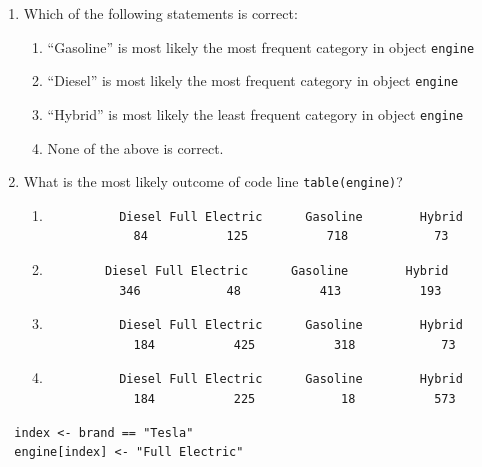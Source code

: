 \documentclass{article}
\begin{document}
\begin{enumerate}[resume]
  \item Which of the following statements is correct:
  \begin{enumerate}[label=\Alph*)]
    \item ``Gasoline'' is most likely the most frequent category in object \texttt{engine}
    \item ``Diesel'' is most likely the most frequent category in object \texttt{engine}
    \item ``Hybrid'' is most likely the least frequent category in object \texttt{engine}
    \item None of the above is correct.
  \end{enumerate}
  \item What is the most likely outcome of code line \texttt{table(engine)}?
    \begin{enumerate}[label=\Alph*)]
      \item 
      \begin{verbatim}
          Diesel Full Electric      Gasoline        Hybrid 
            84           125           718            73 
      \end{verbatim}

      \item 
      \begin{verbatim}
        Diesel Full Electric      Gasoline        Hybrid 
          346            48           413           193
      \end{verbatim}

      \item 
      \begin{verbatim}
          Diesel Full Electric      Gasoline        Hybrid 
            184           425           318            73 
      \end{verbatim}

      \item 
      \begin{verbatim}
          Diesel Full Electric      Gasoline        Hybrid 
            184           225            18           573 
      \end{verbatim}
    \end{enumerate}
\end{enumerate}

\newpage

\begin{lstlisting}
  index <- brand == "Tesla"
  engine[index] <- "Full Electric"
\end{lstlisting}
\end{document}
